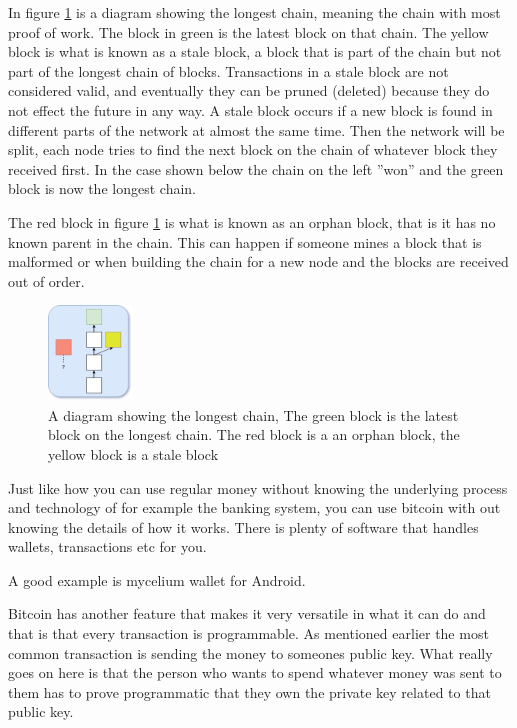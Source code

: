 In figure \ref{fig:blockchain2} is a diagram showing the longest chain, meaning the chain with most proof of work. The block in green is the latest block on that chain. The yellow block is what is known as a stale block, a block that is part of the chain but not part of the longest chain of blocks. Transactions in a stale block are not considered valid, and eventually they can be pruned (deleted) because they do not effect the future in any way. A stale block occurs if a new block is found in different parts of the network at almost the same time. Then the network will be split, each node tries to find the next block on the chain of whatever block they received first. In the case shown below the chain on the left ''won'' and the green block is now the longest chain.

The red block in figure \ref{fig:blockchain2} is what is known as an orphan block, that is it has no known parent in the chain. This can happen if someone mines a block that is malformed or when building the chain for a new node and the blocks are received out of order.

\begin{figure}[H]
	\centering
	\includegraphics[width=0.2\textwidth]{introduction/images/more_blockchain.png}
	\caption{A diagram showing the longest chain, The green block is the latest block on the longest chain. The red block is a an orphan block, the yellow block is a stale block}
	\label{fig:blockchain2}
\end{figure}


Just like how you can use regular money without knowing the underlying process and technology of for example the banking system, you can use bitcoin with out knowing the details of how it works. There is plenty of software that handles wallets, transactions etc for you. 

A good example is mycelium wallet for Android.

Bitcoin has another feature that makes it very versatile in what it can do and that is that every transaction is programmable. As mentioned earlier the most common transaction is sending the money to someones public key. What really goes on here is that the person who wants to spend whatever money was sent to them has to prove programmatic that they own the private key related to that public key. 

